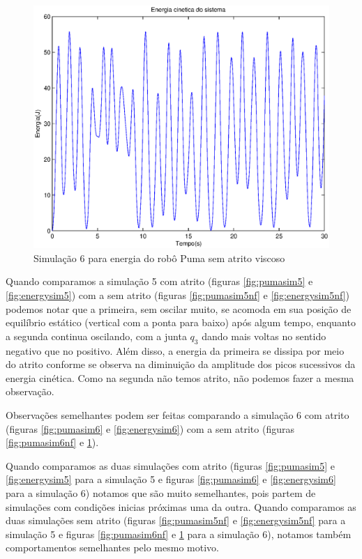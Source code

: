 \documentclass{article}
\begin{document}
\begin{figure}[H]
	\centering
	\includegraphics[width=0.8\linewidth]{../longsims/sime2kin.eps}
	\caption{Simulação 6 para energia do robô Puma sem atrito viscoso}
	\label{fig:energysim6nf}
\end{figure}

Quando comparamos a simulação 5 com atrito (figuras \ref{fig:pumasim5} e \ref{fig:energysim5}) com a sem atrito (figuras \ref{fig:pumasim5nf} e \ref{fig:energysim5nf}) podemos notar que a primeira, sem oscilar muito, se acomoda em sua posição de equilíbrio estático (vertical com a ponta para baixo) após algum tempo, enquanto a segunda continua oscilando, com a junta $q_3$ dando mais voltas no sentido negativo que no positivo. Além disso, a energia da primeira se dissipa por meio do atrito conforme se observa na diminuição da amplitude dos picos sucessivos da energia cinética. Como na segunda não temos atrito, não podemos fazer a mesma observação. 

Observações semelhantes podem ser feitas comparando a simulação 6 com atrito (figuras \ref{fig:pumasim6} e \ref{fig:energysim6}) com a sem atrito (figuras \ref{fig:pumasim6nf} e \ref{fig:energysim6nf}).

Quando comparamos as duas simulações com atrito (figuras \ref{fig:pumasim5} e \ref{fig:energysim5} para a simulação 5 e figuras \ref{fig:pumasim6} e \ref{fig:energysim6} para a simulação 6) notamos que são muito semelhantes, pois partem de simulações com condições inicias próximas uma da outra. Quando comparamos as duas simulações sem atrito (figuras \ref{fig:pumasim5nf} e \ref{fig:energysim5nf} para a simulação 5 e figuras \ref{fig:pumasim6nf} e \ref{fig:energysim6nf} para a simulação 6), notamos também comportamentos semelhantes pelo mesmo motivo.
\end{document}
